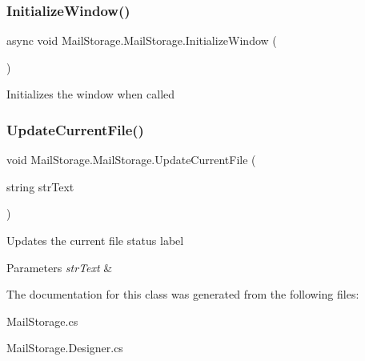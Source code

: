 \subsubsection{\texorpdfstring{Initialize\+Window()}{InitializeWindow()}}
{\footnotesize\ttfamily async void Mail\+Storage.\+Mail\+Storage.\+Initialize\+Window (\begin{DoxyParamCaption}{ }\end{DoxyParamCaption})}



Initializes the window when called 

\mbox{\label{class_mail_storage_1_1_mail_storage_a6786eea13365af4431e55937b52b8e22}} 
\subsubsection{\texorpdfstring{Update\+Current\+File()}{UpdateCurrentFile()}}
{\footnotesize\ttfamily void Mail\+Storage.\+Mail\+Storage.\+Update\+Current\+File (\begin{DoxyParamCaption}\item[{string}]{str\+Text }\end{DoxyParamCaption})}



Updates the current file status label 


\begin{DoxyParams}{Parameters}
{\em str\+Text} & \\
\hline
\end{DoxyParams}


The documentation for this class was generated from the following files\+:\begin{DoxyCompactItemize}
\item 
Mail\+Storage.\+cs\item 
Mail\+Storage.\+Designer.\+cs\end{DoxyCompactItemize}
